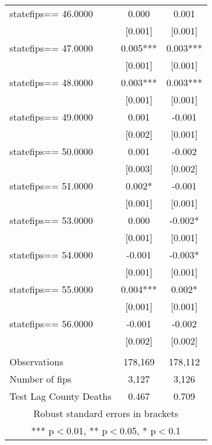 \documentclass[]{article}
\begin{document}
\begin{tabular}{lcc}
statefips==    46.0000 & 0.000 & 0.001 \\
 & [0.001] & [0.001] \\
statefips==    47.0000 & 0.005*** & 0.003*** \\
 & [0.001] & [0.001] \\
statefips==    48.0000 & 0.003*** & 0.003*** \\
 & [0.001] & [0.001] \\
statefips==    49.0000 & 0.001 & -0.001 \\
 & [0.002] & [0.001] \\
statefips==    50.0000 & 0.001 & -0.002 \\
 & [0.003] & [0.002] \\
statefips==    51.0000 & 0.002* & -0.001 \\
 & [0.001] & [0.001] \\
statefips==    53.0000 & 0.000 & -0.002* \\
 & [0.001] & [0.001] \\
statefips==    54.0000 & -0.001 & -0.003* \\
 & [0.001] & [0.001] \\
statefips==    55.0000 & 0.004*** & 0.002* \\
 & [0.001] & [0.001] \\
statefips==    56.0000 & -0.001 & -0.002 \\
 & [0.002] & [0.002] \\
 &  &  \\
Observations & 178,169 & 178,112 \\
Number of fips & 3,127 & 3,126 \\
 Test Lag County Deaths & 0.467 & 0.709 \\ \hline
\multicolumn{3}{c}{ Robust standard errors in brackets} \\
\multicolumn{3}{c}{ *** p$<$0.01, ** p$<$0.05, * p$<$0.1} \\
\end{tabular}
\end{document}
